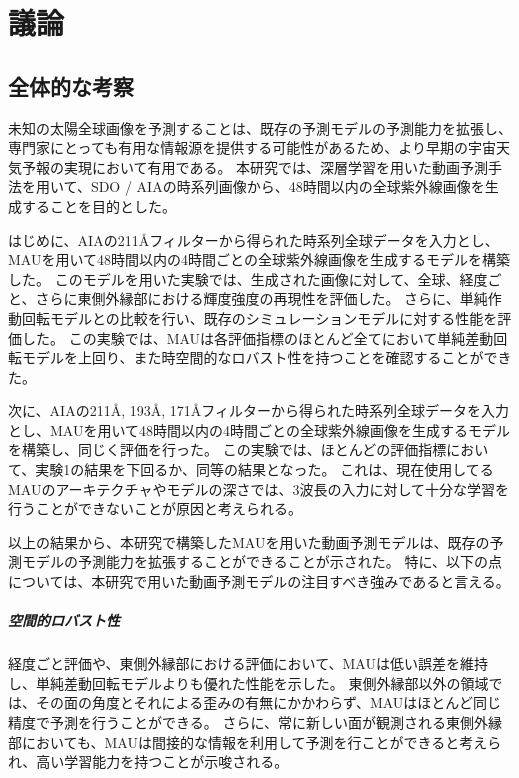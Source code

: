 \chapter{議論}

\section{全体的な考察}
  未知の太陽全球画像を予測することは、既存の予測モデルの予測能力を拡張し、専門家にとっても有用な情報源を提供する可能性があるため、より早期の宇宙天気予報の実現において有用である。
  本研究では、深層学習を用いた動画予測手法を用いて、SDO / AIAの時系列画像から、48時間以内の全球紫外線画像を生成することを目的とした。

  はじめに、AIAの211\AA フィルターから得られた時系列全球データを入力とし、MAUを用いて48時間以内の4時間ごとの全球紫外線画像を生成するモデルを構築した。
  このモデルを用いた実験では、生成された画像に対して、全球、経度ごと、さらに東側外縁部における輝度強度の再現性を評価した。
  さらに、単純作動回転モデルとの比較を行い、既存のシミュレーションモデルに対する性能を評価した。
  この実験では、MAUは各評価指標のほとんど全てにおいて単純差動回転モデルを上回り、また時空間的なロバスト性を持つことを確認することができた。
  
  次に、AIAの211\AA, 193\AA, 171\AA フィルターから得られた時系列全球データを入力とし、MAUを用いて48時間以内の4時間ごとの全球紫外線画像を生成するモデルを構築し、同じく評価を行った。
  この実験では、ほとんどの評価指標において、実験1の結果を下回るか、同等の結果となった。
  これは、現在使用してるMAUのアーキテクチャやモデルの深さでは、3波長の入力に対して十分な学習を行うことができないことが原因と考えられる。
  
  以上の結果から、本研究で構築したMAUを用いた動画予測モデルは、既存の予測モデルの予測能力を拡張することができることが示された。
  特に、以下の点については、本研究で用いた動画予測モデルの注目すべき強みであると言える。

  \paragraph{空間的ロバスト性}
    経度ごと評価や、東側外縁部における評価において、MAUは低い誤差を維持し、単純差動回転モデルよりも優れた性能を示した。
    東側外縁部以外の領域では、その面の角度とそれによる歪みの有無にかかわらず、MAUはほとんど同じ精度で予測を行うことができる。
    さらに、常に新しい面が観測される東側外縁部においても、MAUは間接的な情報を利用して予測を行ことができると考えられ、高い学習能力を持つことが示唆される。
    
